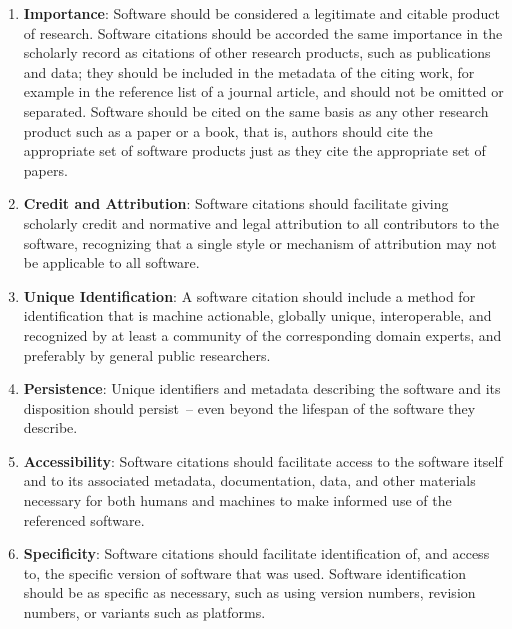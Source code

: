 \documentclass[12pt, oneside]{amsart}
\begin{document}
\begin{enumerate}
\item \textbf{Importance}: \label{principle:importance} Software should be
considered a legitimate and citable product of research. Software citations should
be accorded the same importance in the scholarly record as citations of other
research products, such as publications and data; they should be included in the
metadata of the citing work, for example in the reference list of a journal article,
and should not be omitted or separated.
Software should be cited on the same basis as any other research product such as
a paper or a book, that is, authors should cite the appropriate set of software
products just as they cite the appropriate set of papers.

\item \textbf{Credit and Attribution}: \label{principle:credit}
Software citations should facilitate giving scholarly credit and normative
and legal attribution to all contributors to the software, recognizing
that a single style or mechanism of attribution may not be applicable to
all software.

\item \textbf{Unique Identification}: \label{principle:uid}
A software citation should include a method for identification that is
machine actionable, globally unique, interoperable, and recognized by
at least a community of the corresponding domain experts, and preferably by
general public researchers.

\item \textbf{Persistence}: \label{principle:persistence}
Unique identifiers and metadata describing the software and its disposition
should persist~-- even beyond the lifespan of the software they describe.

\item \textbf{Accessibility}: \label{principle:accessibility} Software citations
should facilitate access to the software itself and to its
associated metadata, documentation, data, and other materials necessary
for both humans and machines to make informed use of the referenced software.

\item \textbf{Specificity}: \label{principle:specificity} Software citations should facilitate identification
of, and access to, the specific version of software that was used. Software
identification should be as specific as necessary, such as using version
numbers, revision numbers, or variants such as platforms.
\end{enumerate}
\end{document}
